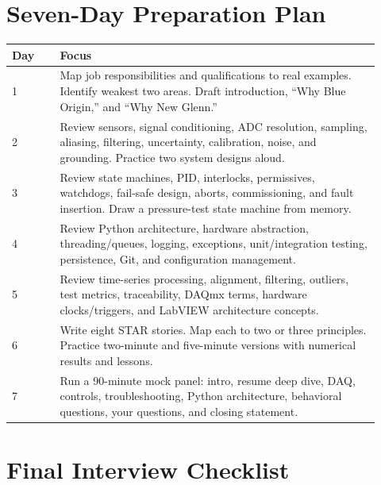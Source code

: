 \documentclass[11pt]{article}
\begin{document}
\section{Seven-Day Preparation Plan}

\begin{longtable}{p{0.12\linewidth}p{0.80\linewidth}}
\toprule
\textbf{Day} & \textbf{Focus} \\
\midrule
1 & Map job responsibilities and qualifications to real examples. Identify weakest two areas. Draft introduction, ``Why Blue Origin,'' and ``Why New Glenn.'' \\
2 & Review sensors, signal conditioning, ADC resolution, sampling, aliasing, filtering, uncertainty, calibration, noise, and grounding. Practice two system designs aloud. \\
3 & Review state machines, PID, interlocks, permissives, watchdogs, fail-safe design, aborts, commissioning, and fault insertion. Draw a pressure-test state machine from memory. \\
4 & Review Python architecture, hardware abstraction, threading/queues, logging, exceptions, unit/integration testing, persistence, Git, and configuration management. \\
5 & Review time-series processing, alignment, filtering, outliers, test metrics, traceability, DAQmx terms, hardware clocks/triggers, and LabVIEW architecture concepts. \\
6 & Write eight STAR stories. Map each to two or three principles. Practice two-minute and five-minute versions with numerical results and lessons. \\
7 & Run a 90-minute mock panel: intro, resume deep dive, DAQ, controls, troubleshooting, Python architecture, behavioral questions, your questions, and closing statement. \\
\bottomrule
\end{longtable}

\section{Final Interview Checklist}
\end{document}
